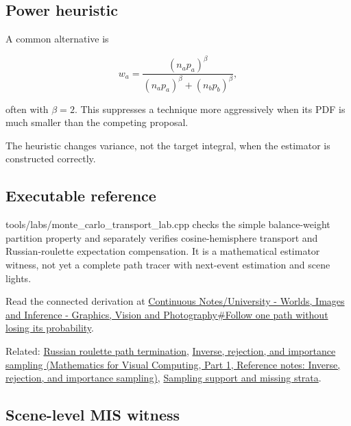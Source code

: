\subsection{Power heuristic}\label{appendix-ca8898faf1a6-power-heuristic}

\hypertarget{appendix-ca8898faf1a6-power-heuristic}{}

A common alternative is

\[
w_a=
\frac{(n_a p_a)^\beta}
{(n_a p_a)^\beta+(n_b p_b)^\beta},
\]

often with \(\beta=2\). This suppresses a technique more aggressively when its PDF is much smaller than the competing proposal.

The heuristic changes variance, not the target integral, when the estimator is constructed correctly.

\subsection{Executable reference}\label{appendix-ca8898faf1a6-executable-reference}

\hypertarget{appendix-ca8898faf1a6-executable-reference}{}

tools/labs/monte\_carlo\_transport\_lab.cpp checks the simple balance-weight partition property and separately verifies cosine-hemisphere transport and Russian-roulette expectation compensation. It is a mathematical estimator witness, not yet a complete path tracer with next-event estimation and scene lights.

Read the connected derivation at \hyperref[03-visual-computing-i-ch007-follow-one-path-without-losing-its-probability]{Continuous Notes/University - Worlds, Images and Inference - Graphics, Vision and Photography\#Follow one path without losing its probability}.

Related: \hyperref[appendix-7277c62d4599]{Russian roulette path termination}, \href{../02-Mathematics-for-Visual-Computing-P01/main.pdf\#nameddest=appendix-8d863ed954d0}{Inverse, rejection, and importance sampling (Mathematics for Visual Computing, Part 1, Reference notes: Inverse, rejection, and importance sampling)}, \hyperref[appendix-10308c3d753e]{Sampling support and missing strata}.

\subsection{Scene-level MIS witness}\label{appendix-ca8898faf1a6-scene-level-mis-witness}

